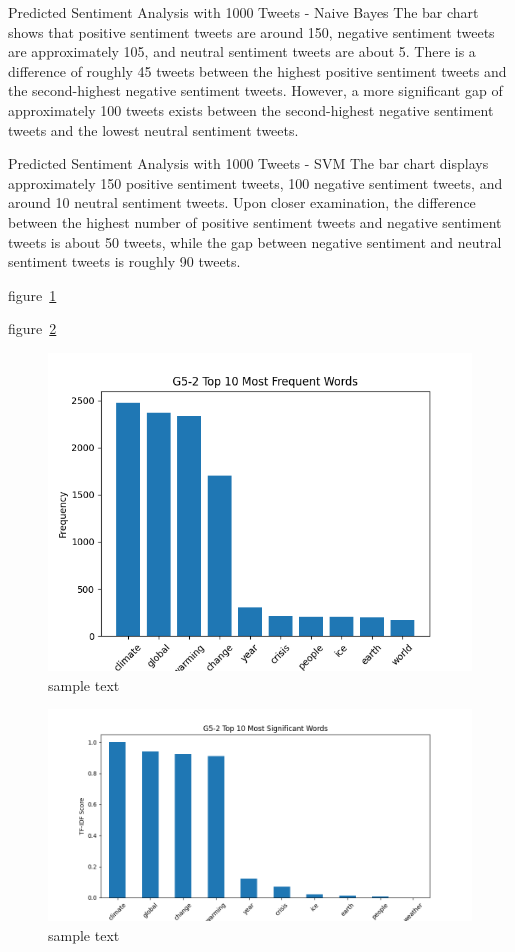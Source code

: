\documentclass[12pt,titlepage]{article}
\begin{document}
Predicted Sentiment Analysis with 1000 Tweets - Naive Bayes 
The bar chart shows that positive sentiment tweets are around 150, negative sentiment tweets are approximately 105, and neutral sentiment tweets are about 5. There is a difference of roughly 45 tweets between the highest positive sentiment tweets and the second-highest negative sentiment tweets. However, a more significant gap of approximately 100 tweets exists between the second-highest negative sentiment tweets and the lowest neutral sentiment tweets.

Predicted Sentiment Analysis with 1000 Tweets - SVM
The bar chart displays approximately 150 positive sentiment tweets, 100 negative sentiment tweets, and around 10 neutral sentiment tweets. Upon closer examination, the difference between the highest number of positive sentiment tweets and negative sentiment tweets is about 50 tweets, while the gap between negative sentiment and neutral sentiment tweets is roughly 90 tweets.

figure~\ref{fig:top10}

figure~\ref{fig:tfidf}

\begin{figure}[!ht]
  \includegraphics[width=6in]{G5-2_FrequentTop10.png}
  \caption{sample text}
  \label{fig:top10}
\end{figure}

\begin{figure}[!ht]
  \includegraphics[width=6in]{G5-2_TF-IDF.png}
  \caption{sample text}
  \label{fig:tfidf}
\end{figure}
\end{document}
